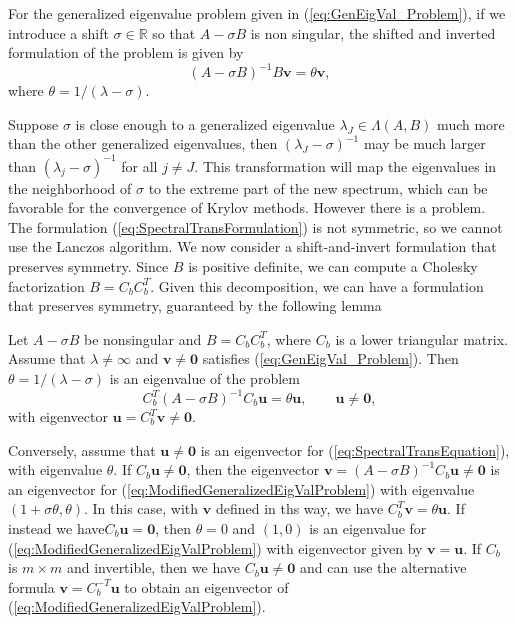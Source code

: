 For the generalized eigenvalue problem given in (\ref{eq:GenEigVal_Problem}), if we introduce a shift $\sigma \in \mathbb{R}$ so that $A - \sigma B$ is non singular, the shifted and inverted formulation of the problem is given by
\begin{equation}\label{eq:SpectralTransFormulation}
	(A - \sigma B)^{-1} B\mathbf{v} = \theta \mathbf{v},
\end{equation}
where $\theta = 1 / (\lambda - \sigma)$.

Suppose $\sigma$ is close enough to a generalized eigenvalue $\lambda_J \in \Lambda(A, B)$ much more than the other generalized eigenvalues, then $(\lambda_J - \sigma)^{-1}$ may be much larger than $(\lambda_j - \sigma)^{-1}$ for all $j \neq J$. This transformation will map the eigenvalues in the neighborhood of $\sigma$ to the extreme part of the new spectrum, which can be favorable for the convergence of Krylov methods.  However there is a problem.  The formulation (\ref{eq:SpectralTransFormulation}) is not symmetric, so we cannot use the Lanczos algorithm.  We now consider a shift-and-invert formulation that preserves symmetry. Since $B$ is positive definite, we can compute a Cholesky factorization $B = C_bC_b^T$. Given this decomposition, we can have a formulation that preserves symmetry, guaranteed by the following lemma
 \begin{lemma}\label{lemma:SpectralTransLemma}
 	Let $A-\sigma B$ be nonsingular and $B = C_bC_b^T$, where $C_b$ is a lower triangular matrix. Assume that $\lambda \neq \infty$ and $\mathbf{v} \neq \mathbf{0}$ satisfies (\ref{eq:GenEigVal_Problem}). Then $\theta = 1/(\lambda - \sigma)$  is an eigenvalue of the problem
 	\begin{equation}\label{eq:SpectralTransEquation}
 		C_b^T(A-\sigma B)^{-1}C_b \mathbf{u} = \theta \mathbf{u}, \qquad \mathbf{u} \neq \mathbf{0},
 	\end{equation}
 	with eigenvector $\mathbf{u} = C_b^T\mathbf{v} \neq \mathbf{0}$.
 	
 	Conversely, assume that $\mathbf{u} \neq \mathbf{0}$ is an eigenvector for (\ref{eq:SpectralTransEquation}), with eigenvalue $\theta$. If $C_b\mathbf{u} \neq \mathbf{0}$, then the eigenvector $\mathbf{v} = (A -\sigma B)^{-1}C_b\mathbf{u} \neq \mathbf{0}$ is an eigenvector for (\ref{eq:ModifiedGeneralizedEigValProblem}) with eigenvalue $(1+\sigma \theta, \theta)$. In this case, with $\mathbf{v}$ defined in ths way, we have $C_b^T\mathbf{v} = \theta \mathbf{u}$. If instead we have$C_b\mathbf{u} = \mathbf{0}$, then $\theta = 0$ and $(1, 0)$ is an eigenvalue for (\ref{eq:ModifiedGeneralizedEigValProblem}) with eigenvector given by $\mathbf{v} = \mathbf{u}$. If $C_b$ is $m \times m$ and invertible, then we have $C_b\mathbf{u} \neq \mathbf{0}$ and can use the alternative formula $\mathbf{v} = C_b^{-T}\mathbf{u}$ to obtain an eigenvector of (\ref{eq:ModifiedGeneralizedEigValProblem}).
 \end{lemma}
